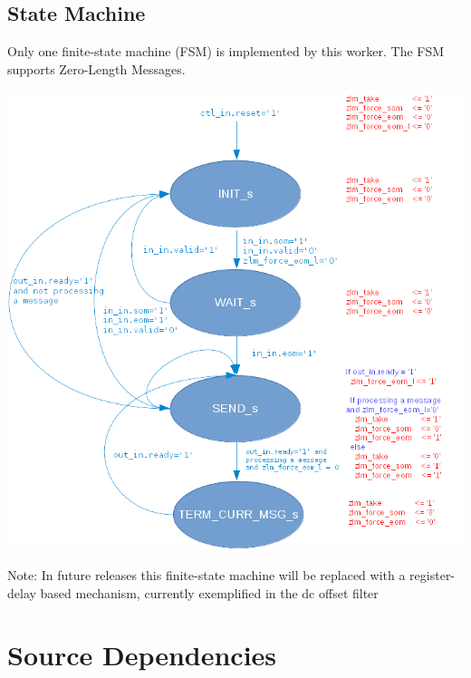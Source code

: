 \documentclass{article}
\begin{document}
\subsection*{State Machine}
\begin{flushleft}
	Only one finite-state machine (FSM) is implemented by this worker. The FSM supports Zero-Length Messages.
\end{flushleft}
{\centering\captionsetup{type=figure}\includegraphics[scale=0.45]{phase_to_amp_cordic_zlm_fsm}
	\label{fig:zlm_fsm}}
\begin{flushleft}
        Note: In future releases this finite-state machine will be replaced with a register-delay based mechanism, currently exemplified in the dc offset filter
\end{flushleft}

\newpage

\section*{Source Dependencies}
\end{document}
